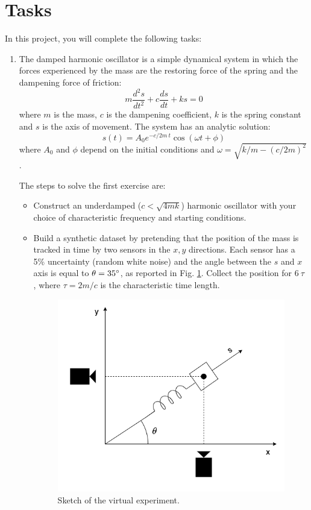 \documentclass[11pt]{article}
\begin{document}
\section*{Tasks}

In this project, you will complete the following tasks:

\begin{enumerate}[start=1,label={\bfseries Task \arabic*:}]
\item The damped harmonic oscillator is a simple dynamical system in which the forces experienced by the mass are the restoring force of the spring and the dampening force of friction:
\begin{equation}
m\frac{d^2s}{dt^2} + c \frac{ds}{dt} + ks = 0
\end{equation}where $m$ is the mass, $c$ is the dampening coefficient, $k$ is the spring constant and $s$ is the axis of movement. The system has an analytic solution:
\begin{equation}
s(t) = A_0e^{-c/2m \ t}\cos(\omega t + \phi) 
\end{equation}where $A_0$ and $\phi$ depend on the initial conditions and $\omega = \sqrt{k/m - (c/2m)^2}$. \par
The steps to solve the first exercise are:
\begin{itemize}
\item  Construct an underdamped ($c < \sqrt{4 m k}$) harmonic oscillator with your choice of characteristic frequency and starting conditions.
\item Build a synthetic dataset by pretending that the position of the mass is tracked in time by two sensors in the $x, y$ directions. Each sensor has a 5\% uncertainty (random white noise) and the angle between the $s$ and $x$ axis is equal to $\theta = 35 \degree$, as reported in Fig. \ref{fig_spring_experiment}. Collect the position for $6 \ \tau$ , where $\tau = 2m/c$ is the characteristic time length. 

\begin{figure}[h]
\centering
\includegraphics[width=4in]{Images/Spring_experiment.png}
\caption{Sketch of the virtual experiment.}
\label{fig_spring_experiment} 
\end{figure}


\end{itemize}
\end{enumerate}
\end{document}
